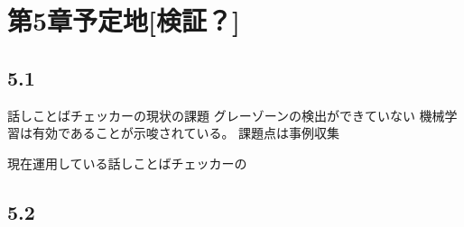\chapter{第5章予定地[検証？] \label{c5}}

\section{5.1 \label{c5s1}}
話しことばチェッカーの現状の課題
グレーゾーンの検出ができていない
機械学習は有効であることが示唆されている。
課題点は事例収集

現在運用している話しことばチェッカーの



\section{5.2 \label{c5s2}}

